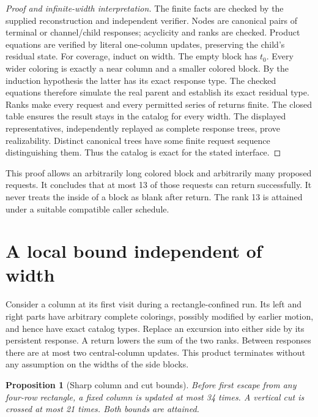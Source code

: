 \documentclass[11pt]{article}
\newtheorem{proposition}[theorem]{Proposition}
\theoremstyle{definition}\newtheorem{definition}[theorem]{Definition}
\begin{document}
\begin{proof}[Proof and infinite-width interpretation]
The finite facts are checked by the supplied reconstruction and independent
verifier. Nodes are canonical pairs of terminal or channel/child responses;
acyclicity and ranks are checked. Product equations are verified by literal
one-column updates, preserving the child's residual state.
For coverage, induct on width. The empty block has $t_0$. Every wider coloring
is exactly a near column and a smaller colored block. By the induction
hypothesis the latter has its exact response type. The checked equations
therefore simulate the real parent and establish its exact residual type.
Ranks make every request and every permitted series of returns finite.
The closed table ensures the result stays in the catalog for every width.
The displayed representatives, independently replayed as complete response
trees, prove realizability. Distinct canonical trees have some finite request
sequence distinguishing them. Thus the catalog is exact for the stated interface.
\end{proof}

This proof allows an arbitrarily long colored block and arbitrarily many
proposed requests. It concludes that at most 13 of those requests can return
successfully. It never treats the inside of a block as blank after return.
The rank 13 is attained under a suitable compatible caller schedule.

\section{A local bound independent of width}
Consider a column at its first visit during a rectangle-confined run. Its
left and right parts have arbitrary complete colorings, possibly modified by
earlier motion, and hence have exact catalog types. Replace an excursion into
either side by its persistent response. A return lowers the sum of the two
ranks. Between responses there are at most two central-column updates. This
product terminates without any assumption on the widths of the side blocks.

\begin{proposition}[Sharp column and cut bounds]\label{prop:column}
Before first escape from any four-row rectangle, a fixed column is updated at
most 34 times. A vertical cut is crossed at most 21 times. Both bounds are attained.
\end{proposition}
\end{document}
